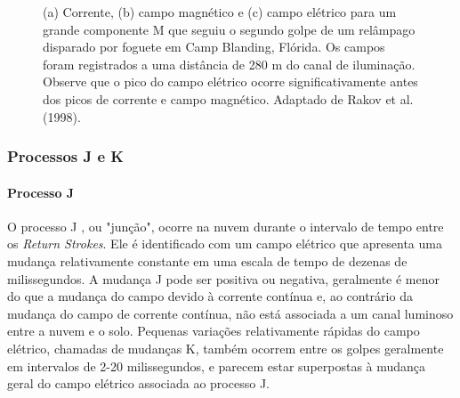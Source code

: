\documentclass[a4paper, 12pt, onecolumn,singlespacing]{article}
\begin{document}
			\begin{figure}[!htb]
				\caption{(a) Corrente, (b) campo magnético e (c) campo elétrico para um grande componente M que seguiu o segundo golpe de um relâmpago disparado por foguete em Camp Blanding, Flórida. Os campos foram registrados a uma distância de 280 m do canal de iluminação. Observe que o pico do campo elétrico ocorre significativamente antes dos picos de corrente e campo magnético. Adaptado de Rakov et al. (1998).}
				\label{componente_m}
				 \hfill
			\end{figure}


	\subsubsection{Processos J e K}
	
		\paragraph{Processo J} O processo J \cite{UHMAN_1987}, ou "junção", ocorre na nuvem durante o intervalo de tempo entre os \textit{Return Strokes}. Ele é identificado com um campo elétrico que apresenta uma mudança relativamente constante em uma escala de tempo de dezenas de milissegundos. A mudança J pode ser positiva ou negativa, geralmente é menor do que a mudança do campo devido à corrente contínua e, ao contrário da mudança do campo de corrente contínua, não está associada a um canal luminoso entre a nuvem e o solo. Pequenas variações relativamente rápidas do campo elétrico, chamadas de mudanças K, também ocorrem entre os golpes geralmente em intervalos de 2-20 milissegundos, e parecem estar superpostas à mudança geral do campo elétrico associada ao processo J.
		
\end{document}
